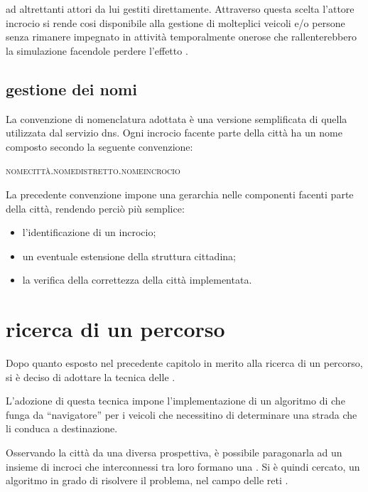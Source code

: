 ad altrettanti attori da lui gestiti direttamente. Attraverso questa scelta l'attore incrocio si rende cosi disponibile alla gestione di molteplici veicoli e/o persone senza rimanere impegnato in attività temporalmente onerose che rallenterebbero la simulazione facendole perdere l'effetto .

\subsection*{gestione dei nomi}
\label{analisi-della-soluzione-gestione-dei-nomi}
La convenzione di nomenclatura adottata è una versione semplificata di quella utilizzata dal servizio \ac{dns}. Ogni incrocio facente parte della città ha un nome composto secondo la seguente convenzione:

\begin{center}
\textsc{nome\-città.nome\-distretto.nome\-incrocio}
\end{center}

La precedente convenzione impone una gerarchia nelle componenti facenti parte della città, rendendo perciò più semplice:

\begin{itemize}
\item{l'identificazione di un incrocio;}
\item{un eventuale estensione della struttura cittadina;}
\item{la verifica della correttezza della città implementata.}
\end{itemize}

\section*{ricerca di un percorso}
\label{analisi-della-soluzione-ricerca-di-un-percorso}
Dopo quanto esposto nel precedente capitolo in merito alla ricerca di un percorso, si è deciso di adottare la tecnica delle .

L'adozione di questa tecnica impone l'implementazione di un algoritmo di  che funga da ``navigatore'' per i veicoli che necessitino di determinare una strada che li conduca a destinazione.

Osservando la città da una diversa prospettiva, è possibile paragonarla ad un insieme di incroci che interconnessi tra loro formano una . Si è quindi cercato, un algoritmo in grado di risolvere il problema, nel campo delle reti .

